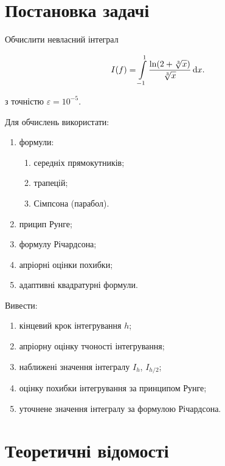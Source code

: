 




\tableofcontents

\section{Постановка задачі}

Обчислити невласний інтеграл 

\begin{equation}
	I(f) = \displaystyle\int\limits_{-1}^1 \frac{\ln (2 + \sqrt[3]{x})}{\sqrt[3]{x}} \mathop{}\!\mathrm{d} x.
\end{equation}

з точністю $\varepsilon = 10^{-5}$. \medskip

Для обчислень використати:

\begin{enumerate}
	\item формули:
	\begin{enumerate}
		\item середніх прямокутників;
		\item трапецій;
		\item Сімпсона (парабол).
	\end{enumerate}
	\item прицип Рунге;
	\item формулу Річардсона;
	\item апріорні оцінки похибки;
	\item адаптивні квадратурні формули.
\end{enumerate}

Вивести:

\begin{enumerate}
	\item кінцевий крок інтегрування $h$;
	\item апріорну оцінку тчоності інтегрування;
	\item наближені значення інтегралу $I_h$, $I_{h/2}$;
	\item оцінку похибки інтегрування за принципом Рунге;
	\item уточнене значення інтегралу за формулою Річардсона.
\end{enumerate}

\section{Теоретичні відомості}

